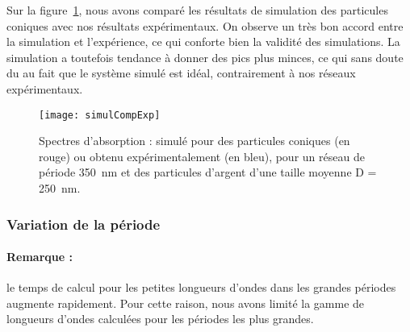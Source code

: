 Sur la figure~\ref{simulCompForme}, nous avons comparé les résultats de simulation des particules coniques avec nos résultats expérimentaux. On observe un très bon accord entre la simulation et l’expérience, ce qui conforte bien la validité des simulations. La simulation a toutefois tendance à donner des pics plus minces, ce qui sans doute du au fait que le système simulé est idéal, contrairement à nos réseaux expérimentaux.\par 
\begin{figure}[!htb]
\centering
\texttt{[image: simulCompExp]}
\caption{Spectres d’absorption : simulé pour des particules coniques (en rouge) ou obtenu expérimentalement (en bleu), pour un réseau de période 350~nm et des particules d'argent d’une taille moyenne D = 250~nm.}
\label{simulCompForme}
\end{figure}
	\subsubsection{Variation de la période}
\paragraph*{Remarque :} le temps de calcul pour les petites longueurs d’ondes dans les grandes périodes augmente rapidement. Pour cette raison, nous avons limité la gamme de longueurs d’ondes calculées pour les périodes les plus grandes.\par 


